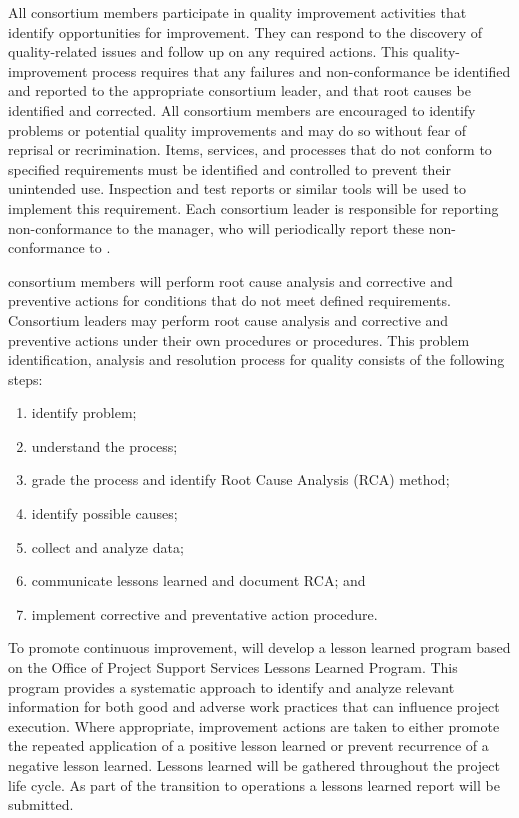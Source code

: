 All  consortium members participate in quality improvement
activities that identify opportunities for improvement. They can
respond to the discovery of quality-related issues and follow up on
any required actions. This quality-improvement process requires that
any failures and non-conformance be identified and reported to the
appropriate consortium leader, and that root causes be identified and
corrected. All consortium members are encouraged to identify problems
or potential quality improvements and may do so without fear of
reprisal or recrimination. Items, services, and processes that do not
conform to specified requirements must be identified and controlled
to prevent their unintended use. Inspection and test reports or
similar tools will be used to implement this requirement. Each
consortium leader is responsible for reporting non-conformance to the
  manager, %
who will periodically report these non-conformance to
 .

 consortium members will perform root cause analysis and
corrective and preventive actions for conditions that do not meet
defined requirements. Consortium leaders may perform root cause
analysis and corrective and preventive actions under their own
procedures or \fnal procedures.  This problem identification, analysis
and resolution process for quality consists of the following steps:
\begin{enumerate}
  \item identify problem;
  \item understand the process;
  \item grade the process and identify Root Cause Analysis (RCA)
    method;
  \item identify possible causes;
  \item collect and analyze data;
  \item communicate lessons learned and document RCA; and
  \item implement corrective and preventative action procedure.
\end{enumerate}


To promote continuous improvement,   will develop a
lesson learned program based on the \fnal Office of Project Support
Services Lessons Learned Program. This program provides a systematic
approach to identify and analyze relevant information for both good
and adverse work practices that can influence project execution. Where
appropriate, improvement actions are taken to either promote the
repeated application of a positive lesson learned or prevent
recurrence of a negative lesson learned. Lessons learned will be
gathered throughout the project life cycle. As part of the transition
to operations a lessons learned report will be submitted.

